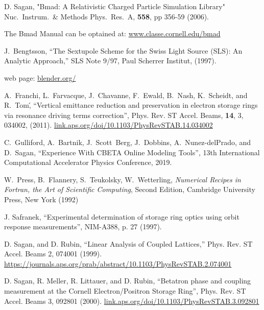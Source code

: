 \begin{thebibliography}{99}

D. Sagan,
"Bmad: A Relativistic Charged Particle Simulation Library"
Nuc.\ Instrum.\ \& Methods Phys.\ Res.\ A, {\bf 558}, pp 356-59 (2006).

The Bmad Manual can be optained at:
\hfill\break
\hspace*{20pt} 
\url{www.classe.cornell.edu/bmad}

J.~Bengtsson,
``The Sextupole Scheme for the Swiss Light Source (SLS): An Analytic Approach,''
SLS Note 9/97, Paul Scherrer Institut, (1997).

 web page:
\hfill\break
\hspace*{20pt} 
\url{blender.org/}

A.~Franchi, L.~Farvacque, J.~Chavanne, F.~Ewald, B.~Nash, K.~Scheidt, and R.~Tom\',
``Vertical emittance reduction and preservation in electron storage rings via resonance driving terms correction'',
Phys. Rev. ST Accel. Beams,
{\bf 14}, 3, 034002, (2011). 
\hfill\break
\hspace*{20pt}
\url{link.aps.org/doi/10.1103/PhysRevSTAB.14.034002}

C.~Gulliford, A.~Bartnik, J.~Scott~Berg, J.~Dobbins, A.~Nunez-delPrado, and D.~Sagan,
``Experience With CBETA Online Modeling Tools'',
13th International Computational Accelerator Physics Conference, 2019.

W.~Press, B.~Flannery, S.~Teukolsky, W.~Wetterling,
{\em Numerical Recipes in Fortran, the Art of Scientific Computing},
Second Edition, Cambridge University Press, New York (1992)

J. Safranek, ``Experimental determination of storage ring optics
using orbit response measurements'', NIM-A388, p. 27 (1997).

D. Sagan, and D. Rubin,
``Linear Analysis of Coupled Lattices,''
Phys. Rev. ST Accel. Beams 2, 074001 (1999).
\hfill\break
\hspace*{20pt}
\url{https://journals.aps.org/prab/abstract/10.1103/PhysRevSTAB.2.074001}

D. Sagan, R. Meller, R. Littauer, and D. Rubin,
``Betatron phase and coupling measurement at the Cornell Electron/Positron Storage Ring'', 
Phys. Rev. ST Accel. Beams 3, 092801 (2000).
\hfill\break
\hspace*{20pt}
\url{link.aps.org/doi/10.1103/PhysRevSTAB.3.092801}


\end{thebibliography}
